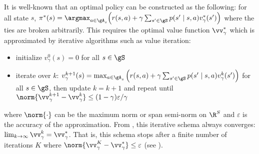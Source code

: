 It is well-known that an optimal policy can be constructed as the following: for all state $s$, $\pi^*(s)=\argmax_{a\in\gA_s}\Big(r(s, a) +\gamma\sum_{s'\in\gS}p(s'\mid s,a)v^*_\gamma(s')\Big)$ where the ties are broken arbitrarily.
This requires the optimal value function $\vv^*_\gamma$ which is approximated by iterative algorithms such as value iteration:
\begin{itemize}
    \item initialize $v_\gamma^0(s)=0$ for all $s\in\gS$
    \item iterate over $k$: $v^{k+1}_\gamma(s) = \max_{a\in\gA_s}\Big(r(s,a)+\gamma\sum_{s'\in\gS}p(s'\mid s,a)v_{\gamma}^k(s')\Big)$ for all $s\in\gS$, then update $k=k+1$ and repeat until $\norm{\vv^{k+1}_\gamma-\vv^k_\gamma}\le(1-\gamma)\varepsilon/\gamma$
\end{itemize}
where $\norm{\cdot}$ can be the maximum norm or span semi-norm on $\R^{S}$ and $\varepsilon$ is the accuracy of the approximation.
From \cite[Chapter~6]{puterman2014markov}, this iterative schema always converges: $\lim_{k\to\infty}\vv^k_\gamma=\vv^*_\gamma$.
That is, this schema stops after a finite number of iterations $K$ where $\norm{\vv^K_\gamma-\vv^*_\gamma}\le \varepsilon$ (see \cite[Theorem~6.3.1]{puterman2014markov}). 
%

